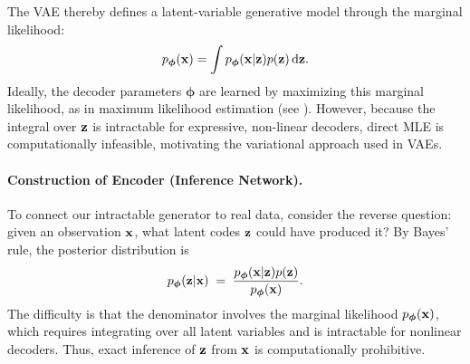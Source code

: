 The VAE thereby defines a latent-variable generative model through the marginal likelihood:
\[
p_{\bm{\phi}}({\mathbf{x}}) = \int p_{\bm{\phi}}({\mathbf{x}}|{\mathbf{z}}) p({\mathbf{z}}) \mathop{}\!\mathrm{d} {\mathbf{z}}.
\]
Ideally, the decoder parameters $\bm{\phi}$ are learned by maximizing this marginal 
likelihood, as in maximum likelihood estimation (see ). 
However, because the integral over ${\mathbf{z}}$ is intractable for expressive, non-linear 
decoders, direct MLE is computationally infeasible, motivating the variational 
approach used in VAEs.




\paragraph{Construction of Encoder (Inference Network).}



To connect our intractable generator to real data, consider the reverse question:  
given an observation ${\mathbf{x}}$, what latent codes ${\mathbf{z}}$ could have produced it?  
By Bayes’ rule, the posterior distribution is
\[
p_{\bm{\phi}}({\mathbf{z}}|{\mathbf{x}}) \;=\; \frac{p_{\bm{\phi}}({\mathbf{x}}|{\mathbf{z}}) p({\mathbf{z}})}{p_{\bm{\phi}}({\mathbf{x}})}.
\]
The difficulty is that the denominator involves the marginal likelihood $p_{\bm{\phi}}({\mathbf{x}})$,  
which requires integrating over all latent variables and is intractable for nonlinear decoders.  
Thus, exact inference of ${\mathbf{z}}$ from ${\mathbf{x}}$ is computationally prohibitive.

